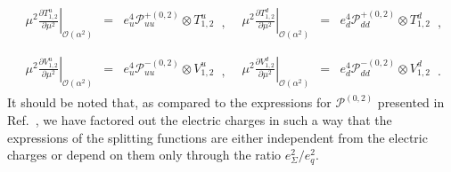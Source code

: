 \begin{equation}
\begin{array}{ll}
\begin{array}{rcl}
\displaystyle \left.\mu^2\frac{\partial T^u_{1,2}}{\partial \mu^2}\right|_{\mathcal{O}(\alpha^2)} &=&
\displaystyle e_u^4\mathcal{P}_{uu}^{+(0,2)}\otimes T^u_{1,2}
\end{array}\,, &
\begin{array}{rcl}
\displaystyle \left.\mu^2\frac{\partial T^d_{1,2}}{\partial \mu^2}\right|_{\mathcal{O}(\alpha^2)} &=&
\displaystyle e_d^4\mathcal{P}_{dd}^{+(0,2)} \otimes T^d_{1,2}
\end{array}\,,
\\
\\
\begin{array}{rcl}
\displaystyle \left.\mu^2\frac{\partial V^u_{1,2}}{\partial \mu^2}\right|_{\mathcal{O}(\alpha^2)} &=&
\displaystyle e_u^4\mathcal{P}_{uu}^{-(0,2)} \otimes V^u_{1,2}
\end{array}\,, &
\begin{array}{rcl}
\displaystyle \left.\mu^2\frac{\partial V^d_{1,2}}{\partial \mu^2}\right|_{\mathcal{O}(\alpha^2)} &=&
\displaystyle e_d^4\mathcal{P}_{dd}^{-(0,2)}\otimes V^d_{1,2}
\end{array}\,.
\end{array}
\end{equation}
It should be noted that, as compared to the expressions for
$\mathcal{P}^{(0,2)}$ presented in Ref.~\cite{deFlorian:2016gvk}, we
have factored out the electric charges in such a way that the
expressions of the splitting functions are either independent from the
electric charges or depend on them only through the ratio
$e_\Sigma^2/e_q^2$.
%

